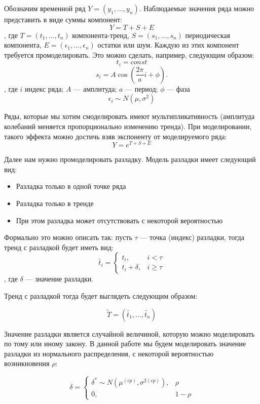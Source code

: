 \documentclass[%
12pt,
master,  %
natbib,      %
subf,        %
substylefile = spbu.rtx,
href,        %
colorlinks,  %
]{disser}
\begin{document}

Обозначим временной ряд $Y = (y_1, \dots, y_n)$. Наблюдаемые значения ряда можно представить в виде суммы компонент:
$$ Y = T + S + E $$, 
где  $ T = (t_1, \dots, t_n) $ компонента-тренд, $ S = (s_1, \dots, s_n) $ периодическая компонента, $ E = (\epsilon_1, \dots, \epsilon_n) $ остатки или шум.
Каждую из этих компонент требуется промоделировать. Это можно сделать, например, следующим образом:
$$ t_i = const $$
$$ s_i = A \cos(\frac{2\pi}{a} i + \phi).$$,
где $i$ индекс ряда; $A$ --- амплитуда; $a$ --- период; $\phi$ --- фаза
$$ \epsilon_i \sim N(\mu, \sigma^2) $$

Ряды, которые мы хотим смоделировать имеют мультипликативность (амплитуда колебаний меняется пропорционально изменению тренда). При моделировании, такого эффекта можно достичь взяв экспоненту от моделируемого ряда:
$$ Y = e^{T + S + E} $$

Далее нам нужно промоделировать разладку. Модель разладки имеет следующий вид:
\begin{itemize}
	\item Разладка только в одной точке ряда
	\item Разладка только в тренде
	\item При этом разладка может отсутствовать с некоторой вероятностью
\end{itemize}
Формально это можно описать так: пусть $\tau$ --- точка (индекс) разладки, тогда тренд с разладкой будет иметь вид:
$$ \tilde{t_i} =
	\begin{cases}
		t_i, & i < \tau \\
		t_i + \delta, & i \geqslant \tau
	\end{cases}
$$
, где $ \delta $  --- значение разладки.

Тренд с разладкой тогда будет выглядеть следующим образом:

$$ \tilde{T} = (\tilde{t_1}, \dots, \tilde{t_n}) $$

Значение разладки является случайной величиной, которую можно моделировать по тому или иному закону. В данной работе мы будем моделировать значение разладки из нормального распределения, с некоторой вероятностью возникновения $ \rho $:

$$   
\delta = \begin{cases}
    		\delta^* \sim N(\mu^{(cp)}, \sigma^{2(cp)}), & \rho \\
  		0, & 1 - \rho
	\end{cases} 
$$
\end{document}
